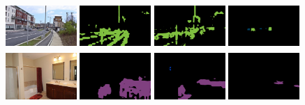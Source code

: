 \begin{figure}[p!]
  {\includegraphics[width=0.24\textwidth, height=1.8cm]{figures/experiments/coco/image/0063.jpg}}
  {\includegraphics[width=0.24\textwidth, height=1.8cm]{figures/experiments/coco/orgckpt/0063.png}}
  {\includegraphics[width=0.24\textwidth, height=1.8cm]{figures/experiments/coco/nonnoisy/0063.png}}
  {\includegraphics[width=0.24\textwidth, height=1.8cm]{figures/experiments/coco/gt/000000006723_instanceTrainIds.png}}
  {\includegraphics[width=0.24\textwidth, height=1.8cm]{figures/experiments/coco/image/0059.jpg}}
  {\includegraphics[width=0.24\textwidth, height=1.8cm]{figures/experiments/coco/orgckpt/0059.png}}
  {\includegraphics[width=0.24\textwidth, height=1.8cm]{figures/experiments/coco/nonnoisy/0059.png}}
  {\includegraphics[width=0.24\textwidth, height=1.8cm]{figures/experiments/coco/gt/000000006213_instanceTrainIds.png}}



\end{figure}
